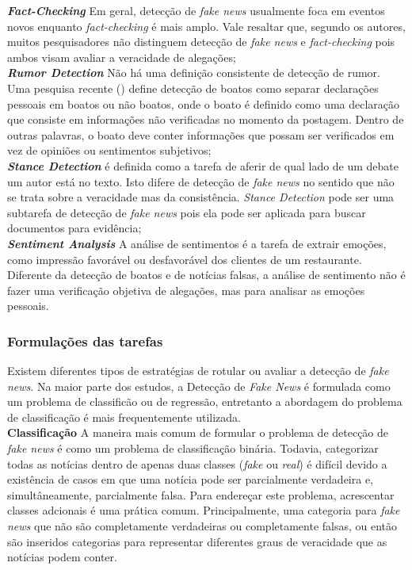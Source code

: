 \textbf{\textit{Fact-Checking}} Em geral, detecção de \textit{fake news} usualmente foca em eventos novos enquanto \textit{fact-checking} é mais amplo. Vale resaltar que, segundo os autores, muitos pesquisadores não distinguem detecção de \textit{fake news} e \textit{fact-checking} pois ambos visam avaliar a veracidade de alegações;  \\

\textbf{\textit{Rumor Detection}} Não há uma definição consistente de detecção de rumor. Uma pesquisa recente (\cite{zubiaga2018}) define detecção de boatos como separar declarações pessoais em boatos ou não boatos, onde o boato é definido como uma declaração que consiste em informações não verificadas no momento da postagem. Dentro de outras palavras, o boato deve conter informações que possam ser verificados em vez de opiniões ou sentimentos subjetivos; \\


\textbf{\textit{Stance Detection}} é definida como a tarefa de aferir de qual lado de um debate um autor está no texto. Isto difere de detecção de \textit{fake news} no sentido que não se trata sobre a veracidade mas da consistência. \textit{Stance Detection} pode ser uma subtarefa de detecção de \textit{fake news} pois ela pode ser aplicada para buscar documentos para evidência; \\


\textbf{\textit{Sentiment Analysis}} A análise de sentimentos é a tarefa de extrair emoções, como impressão favorável ou desfavorável dos clientes de um restaurante. Diferente da detecção de boatos e de notícias falsas, a análise de sentimento não é fazer uma verificação objetiva de alegações, mas para analisar as emoções pessoais. \\


\subsubsection{Formulações das tarefas}

Existem diferentes tipos de estratégias de rotular ou avaliar a detecção de \textit{fake news}. Na maior parte dos estudos, a Detecção de \textit{Fake News} é formulada como um problema de classificão ou de regressão, entretanto a abordagem do problema de classificação é mais frequentemente utilizada. \\

\textbf{Classificação} A maneira mais comum de formular o problema de detecção de \textit{fake news} é como um problema de classificação binária. Todavia, categorizar todas as notícias dentro de apenas duas classes (\textit{fake} ou \textit{real}) é difícil devido a existência de casos em que uma notícia pode ser parcialmente verdadeira e, simultâneamente, parcialmente falsa. Para endereçar este problema, acrescentar classes adcionais é uma prática comum. Principalmente, uma categoria para \textit{fake news} que não são  completamente verdadeiras ou completamente falsas, ou então são inseridos categorias para representar diferentes graus de veracidade que as notícias podem conter. \\


